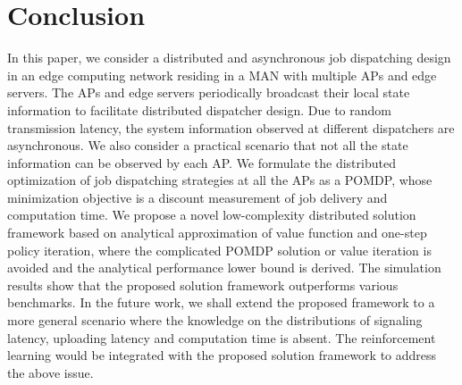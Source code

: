 \section{Conclusion}
\label{sec:conclusion}
In this paper, we consider a distributed and asynchronous job dispatching design in an edge computing network residing in a MAN with multiple APs and edge servers.
The APs and edge servers periodically broadcast their local state information to facilitate distributed dispatcher design.
Due to random transmission latency, the system information observed at different dispatchers are asynchronous.
We also consider a practical scenario that not all the state information can be observed by each AP.
We formulate the distributed optimization of job dispatching strategies at all the APs as a POMDP, whose minimization objective is a discount measurement of job delivery and computation time.
We propose a novel low-complexity distributed solution framework based on analytical approximation of value function and one-step policy iteration, where the complicated POMDP solution or value iteration is avoided and the analytical performance lower bound is derived.
The simulation results show that the proposed solution framework outperforms various benchmarks.
In the future work, we shall extend the proposed framework to a more general scenario where the knowledge on the distributions of signaling latency, uploading latency and computation time is absent.
The reinforcement learning would be integrated with the proposed solution framework to address the above issue.